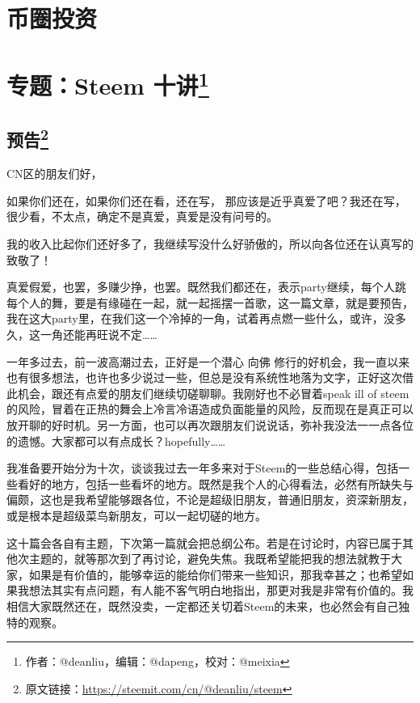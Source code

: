 \documentclass[]{ctexbook}
\begin{document}
\hypertarget{bqtz}{%
\chapter{币圈投资}\label{bqtz}}

\hypertarget{zt_steem_sj}{%
\chapter[专题：Steem 十讲]{\texorpdfstring{专题：Steem 十讲\footnote{作者：@deanliu，编辑：@dapeng，校对：@meixia}}{专题：Steem 十讲}}\label{zt_steem_sj}}

\hypertarget{liu0}{%
\section[预告]{\texorpdfstring{预告\footnote{原文链接：\url{https://steemit.com/cn/@deanliu/steem}}}{预告}}\label{liu0}}

CN区的朋友们好，

如果你们还在，如果你们还在看，还在写， 那应该是近乎真爱了吧？我还在写，很少看，不太点，确定不是真爱，真爱是没有问号的。

我的收入比起你们还好多了，我继续写没什么好骄傲的，所以向各位还在认真写的致敬了！

真爱假爱，也罢，多赚少挣，也罢。既然我们都还在，表示party继续，每个人跳每个人的舞，要是有缘碰在一起，就一起摇摆一首歌，这一篇文章，就是要预告，我在这大party里，在我们这一个冷掉的一角，试着再点燃一些什么，或许，没多久，这一角还能再旺说不定\ldots{}\ldots{}

一年多过去，前一波高潮过去，正好是一个潜心 向佛 修行的好机会，我一直以来也有很多想法，也许也多少说过一些，但总是没有系统性地落为文字，正好这次借此机会，跟还有点爱的朋友们继续切磋聊聊。我刚好也不必冒着speak ill of steem的风险，冒着在正热的舞会上冷言冷语造成负面能量的风险，反而现在是真正可以放开聊的好时机。另一方面，也可以再次跟朋友们说说话，弥补我没法一一点各位的遗憾。大家都可以有点成长？hopefully\ldots{}\ldots{}

我准备要开始分为十次，谈谈我过去一年多来对于Steem的一些总结心得，包括一些看好的地方，包括一些看坏的地方。既然是我个人的心得看法，必然有所缺失与偏颇，这也是我希望能够跟各位，不论是超级旧朋友，普通旧朋友，资深新朋友，或是根本是超级菜鸟新朋友，可以一起切磋的地方。

这十篇会各自有主题，下次第一篇就会把总纲公布。若是在讨论时，内容已属于其他次主题的，就等那次到了再讨论，避免失焦。我既希望能把我的想法就教于大家，如果是有价值的，能够幸运的能给你们带来一些知识，那我幸甚之；也希望如果我想法其实有点问题，有人能不客气明白地指出，那更对我是非常有价值的。我相信大家既然还在，既然没卖，一定都还关切着Steem的未来，也必然会有自己独特的观察。
\end{document}
